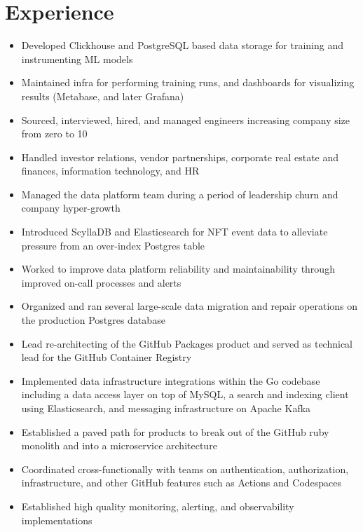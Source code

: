 \documentclass[11pt,letterpaper,sans]{moderncv}        %
\begin{document}
\makecvtitle

\vspace{-10mm}

\section{Experience}

\begin{itemize}
\item Developed Clickhouse and PostgreSQL based data storage for training and instrumenting ML models
\item Maintained infra for performing training runs, and dashboards for visualizing results (Metabase, and later Grafana)
\item Sourced, interviewed, hired, and managed engineers increasing company size from zero to 10
\item Handled investor relations, vendor partnerships, corporate real estate and finances, information technology, and HR
\end{itemize}

\begin{itemize}
\item Managed the data platform team during a period of leadership churn and company hyper-growth
\item Introduced ScyllaDB and Elasticsearch for NFT event data to alleviate pressure from an over-index Postgres table
\item Worked to improve data platform reliability and maintainability through improved on-call processes and alerts
\item Organized and ran several large-scale data migration and repair operations on the production Postgres database
\end{itemize}

\begin{itemize}
\item Lead re-architecting of the GitHub Packages product and served as technical lead for the GitHub Container Registry
\item Implemented data infrastructure integrations within the Go codebase including a data access layer on top of MySQL, a search and indexing client using Elasticsearch, and messaging infrastructure on Apache Kafka
\item Established a paved path for products to break out of the GitHub ruby monolith and into a microservice architecture
\item Coordinated cross-functionally with teams on authentication, authorization, infrastructure, and other GitHub features such as Actions and Codespaces
\item Established high quality monitoring, alerting, and observability implementations
\end{itemize}
\end{document}
